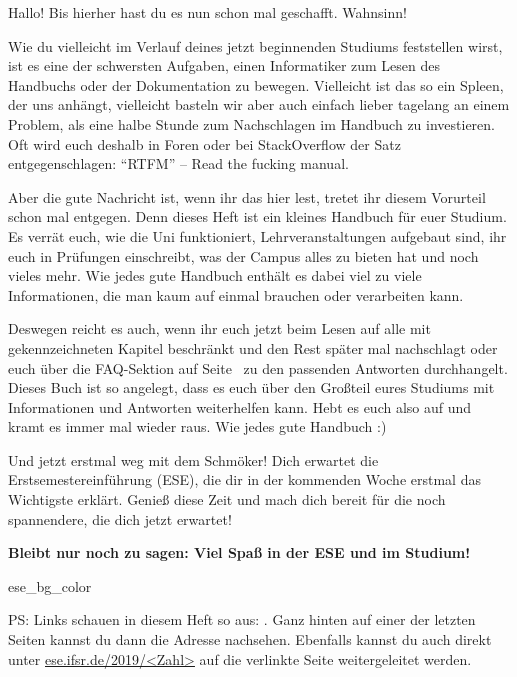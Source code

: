 

Hallo! Bis hierher hast du es nun schon mal geschafft. Wahnsinn!

Wie du vielleicht im Verlauf deines jetzt beginnenden Studiums feststellen wirst, ist es eine der schwersten Aufgaben, einen Informatiker zum Lesen des Handbuchs oder der Dokumentation zu bewegen. Vielleicht ist das so ein Spleen, der uns anhängt, vielleicht basteln wir aber auch einfach lieber tagelang an einem Problem, als eine halbe Stunde zum Nachschlagen im Handbuch zu investieren.
Oft wird euch deshalb in Foren oder bei StackOverflow der Satz entgegenschlagen: \enquote{RTFM} -- Read the fucking manual.

Aber die gute Nachricht ist, wenn ihr das hier lest, tretet ihr diesem Vorurteil schon mal entgegen. Denn dieses Heft ist ein kleines Handbuch für euer Studium.
Es verrät euch, wie die Uni funktioniert, Lehrveranstaltungen aufgebaut sind, ihr euch in Prüfungen einschreibt, was der Campus alles zu bieten hat und noch vieles mehr.
Wie jedes gute Handbuch enthält es dabei viel zu viele Informationen, die man kaum auf einmal brauchen oder verarbeiten kann.

Deswegen reicht es auch, wenn ihr euch jetzt beim Lesen auf alle mit  gekennzeichneten Kapitel beschränkt und den Rest später mal nachschlagt oder euch über die FAQ-Sektion auf Seite~\pageref{sec:faq} zu den passenden Antworten durchhangelt.
Dieses Buch ist so angelegt, dass es euch über den Großteil eures Studiums mit Informationen und Antworten weiterhelfen kann. Hebt es euch also auf und kramt es immer mal wieder raus. Wie jedes gute Handbuch :)

Und jetzt erstmal weg mit dem Schmöker! Dich erwartet die Erstsemestereinführung (ESE), die dir in der kommenden Woche erstmal das Wichtigste erklärt.
Genieß diese Zeit und mach dich bereit für die noch spannendere, die dich jetzt erwartet!

\textbf{Bleibt nur noch zu sagen: Viel Spaß in der ESE und im Studium!}


\bigskip
\begin{awesomeblock}{2pt}{\faLightbulb[regular]}{ese_bg_color}
    \begin{minipage}[t]{.82\textwidth}
\small PS\@: Links schauen in diesem Heft so aus: . Ganz hinten auf einer der letzten Seiten kannst du dann die Adresse nachsehen. Ebenfalls kannst du auch direkt unter \url{ese.ifsr.de/2019/<Zahl>} auf die verlinkte Seite weitergeleitet werden.
    \end{minipage}
\end{awesomeblock}
